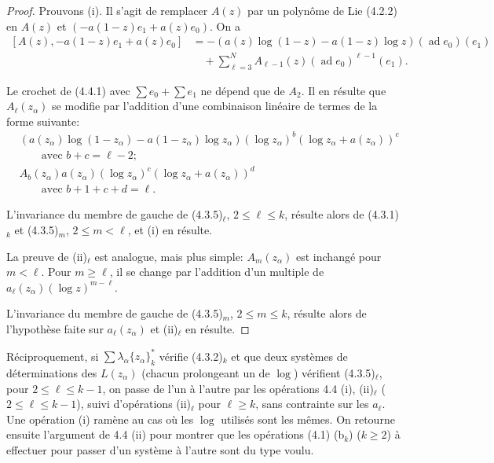\documentclass[12pt,a4paper]{article}
\theoremstyle{plain}
\theoremstyle{definition}
\theoremstyle{remark}
\DeclareMathOperator{\ad}{ad}
\begin{document}
\begin{proof}
Prouvons (i). Il s'agit de remplacer $A(z)$ par un polyn\^ome de Lie (4.2.2) en $A(z)$ et $(-a(1-z)e_1+a(z)e_0)$. On a
\begin{equation}\label{eq:4.4.1}
\begin{aligned}
[A(z),-a(1-z)e_1+a(z)e_0] &= -(a(z)\log(1-z)-a(1-z)\log z)(\ad e_0)(e_1)\\
&\quad +\sum_{\ell=3}^N A_{\ell-1}(z)(\ad e_0)^{\ell-1}(e_1).
\end{aligned}
\tag{4.4.1}
\end{equation}

Le crochet de (4.4.1) avec $\sum e_0+\sum e_1$ ne d\'epend que de $A_2$. Il en r\'esulte que $A_\ell(z_\alpha)$ se modifie par l'addition d'une combinaison lin\'eaire de termes de la forme suivante:
\begin{align*}
&(a(z_\alpha)\log(1-z_\alpha)-a(1-z_\alpha)\log z_\alpha)(\log z_\alpha)^b(\log z_\alpha+a(z_\alpha))^c\\
&\qquad\text{avec }b+c=\ell-2;\\
&A_b(z_\alpha)a(z_\alpha)(\log z_\alpha)^c(\log z_\alpha+a(z_\alpha))^d\\
&\qquad\text{avec }b+1+c+d=\ell.
\end{align*}

L'invariance du membre de gauche de (4.3.5)$_\ell$, $2\leq\ell\leq k$, r\'esulte alors de (4.3.1)$_k$ et (4.3.5)$_m$, $2\leq m<\ell$, et (i) en r\'esulte.

La preuve de (ii)$_\ell$ est analogue, mais plus simple: $A_m(z_\alpha)$ est inchang\'e pour $m<\ell$. Pour $m\geq\ell$, il se change par l'addition d'un multiple de $a_\ell(z_\alpha)(\log z)^{m-\ell}$.

L'invariance du membre de gauche de (4.3.5)$_m$, $2\leq m\leq k$, r\'esulte alors de l'hypoth\`ese faite sur $a_\ell(z_\alpha)$ et (ii)$_\ell$ en r\'esulte.
\end{proof}

R\'eciproquement, si $\sum\lambda_\alpha\{z_\alpha\}_k^*$ v\'erifie (4.3.2)$_k$ et que deux syst\`emes de d\'eterminations des $L(z_\alpha)$ (chacun prolongeant un de $\log$) v\'erifient (4.3.5)$_\ell$, pour $2\leq\ell\leq k-1$, on passe de l'un {\`a} l'autre par les op\'erations 4.4 (i), (ii)$_\ell$ ($2\leq\ell\leq k-1$), suivi d'op\'erations (ii)$_\ell$ pour $\ell\geq k$, sans contrainte sur les $a_\ell$. Une op\'eration (i) ram\`ene au cas o\`u les $\log$ utilis\'es sont les m\^emes. On retourne ensuite l'argument de 4.4 (ii) pour montrer que les op\'erations (4.1) (b$_k$) ($k\geq 2$) {\`a} effectuer pour passer d'un syst\`eme {\`a} l'autre sont du type voulu.
\end{document}
